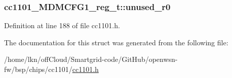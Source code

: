 \subsubsection[{\texorpdfstring{unused\+\_\+r0}{unused_r0}}]{ cc1101\+\_\+\+M\+D\+M\+C\+F\+G1\+\_\+reg\+\_\+t\+::unused\+\_\+r0}\hypertarget{structcc1101___m_d_m_c_f_g1__reg__t_a08d4d43e0250938bc22e94e2c604ead0}{}\label{structcc1101___m_d_m_c_f_g1__reg__t_a08d4d43e0250938bc22e94e2c604ead0}


Definition at line 188 of file cc1101.\+h.



The documentation for this struct was generated from the following file\+:\begin{DoxyCompactItemize}
\item 
/home/lkn/off\+Cloud/\+Smartgrid-\/code/\+Git\+Hub/openwsn-\/fw/bsp/chips/cc1101/\hyperlink{cc1101_8h}{cc1101.\+h}\end{DoxyCompactItemize}
